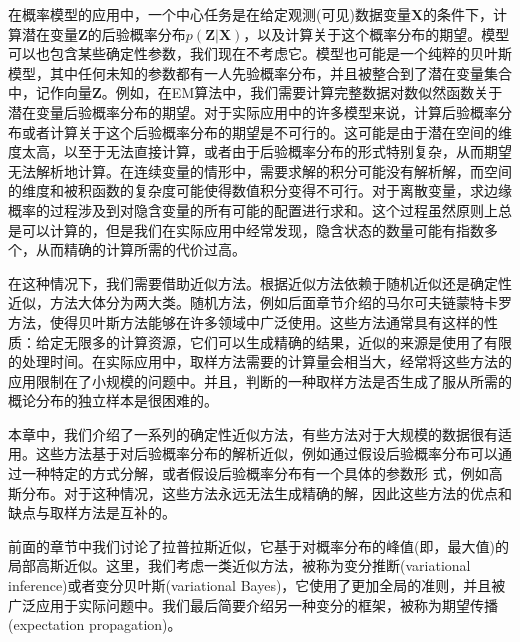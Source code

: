 在概率模型的应用中，一个中心任务是在给定观测(可见)数据变量$\boldsymbol{X}$的条件下，计算潜在变量$\boldsymbol{Z}$的后验概率分布$p(\boldsymbol{Z}|\boldsymbol{X})$，以及计算关于这个概率分布的期望。模型可以也包含某些确定性参数，我们现在不考虑它。模型也可能是一个纯粹的贝叶斯模型，其中任何未知的参数都有一人先验概率分布，并且被整合到了潜在变量集合中，记作向量$\boldsymbol{Z}$。例如，在EM算法中，我们需要计算完整数据对数似然函数关于潜在变量后验概率分布的期望。对于实际应用中的许多模型来说，计算后验概率分布或者计算关于这个后验概率分布的期望是不可行的。这可能是由于潜在空间的维度太高，以至于无法直接计算，或者由于后验概率分布的形式特别复杂，从而期望无法解析地计算。在连续变量的情形中，需要求解的积分可能没有解析解，而空间的维度和被积函数的复杂度可能使得数值积分变得不可行。对于离散变量，求边缘概率的过程涉及到对隐含变量的所有可能的配置进行求和。这个过程虽然原则上总是可以计算的，但是我们在实际应用中经常发现，隐含状态的数量可能有指数多个，从而精确的计算所需的代价过高。

在这种情况下，我们需要借助近似方法。根据近似方法依赖于随机近似还是确定性近似，方法大体分为两大类。随机方法，例如后面章节介绍的马尔可夫链蒙特卡罗方法，使得贝叶斯方法能够在许多领域中广泛使用。这些方法通常具有这样的性质：给定无限多的计算资源，它们可以生成精确的结果，近似的来源是使用了有限的处理时间。在实际应用中，取样方法需要的计算量会相当大，经常将这些方法的应用限制在了小规模的问题中。并且，判断的一种取样方法是否生成了服从所需的概论分布的独立样本是很困难的。

本章中，我们介绍了一系列的确定性近似方法，有些方法对于大规模的数据很有适用。这些方法基于对后验概率分布的解析近似，例如通过假设后验概率分布可以通过一种特定的方式分解，或者假设后验概率分布有一个具体的参数形 式，例如高斯分布。对于这种情况，这些方法永远无法生成精确的解，因此这些方法的优点和缺点与取样方法是互补的。

前面的章节中我们讨论了拉普拉斯近似，它基于对概率分布的峰值(即，最大值)的局部高斯近似。这里，我们考虑一类近似方法，被称为变分推断(variational inference)或者变分贝叶斯(variational Bayes)，它使用了更加全局的准则，并且被广泛应用于实际问题中。我们最后简要介绍另一种变分的框架，被称为期望传播(expectation propagation)。